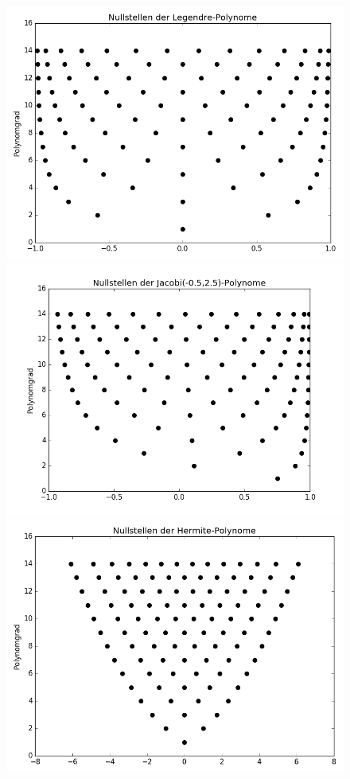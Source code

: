 \begin{figure}[!htb]
  \includegraphics[width=\linewidth]{Figures/roots_legendre.png}
  \includegraphics[width=\linewidth]{Figures/roots_jacobi.png}
\endminipage
{}
  \includegraphics[width=\linewidth]{Figures/roots_hermite.png}

\end{figure}
